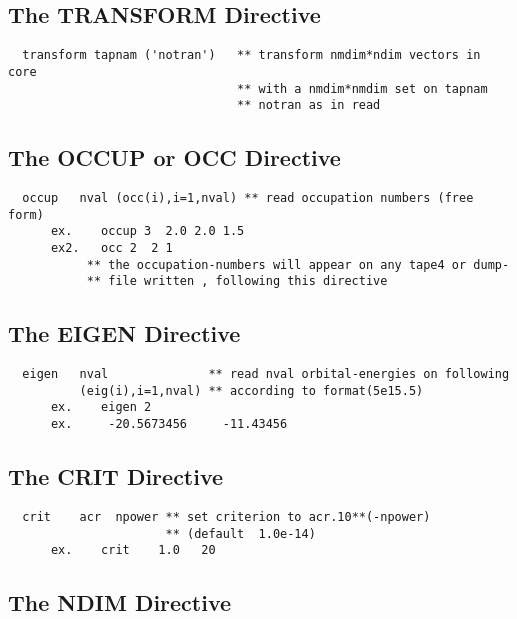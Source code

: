 \documentclass[11pt,fleqn]{article}
\begin{document}
\subsection{The TRANSFORM Directive}

{
\footnotesize
\begin{verbatim} 
  transform tapnam ('notran')   ** transform nmdim*ndim vectors in core
                                ** with a nmdim*nmdim set on tapnam
                                ** notran as in read
\end{verbatim}
}

\subsection{The OCCUP or OCC Directive}

{
\footnotesize
\begin{verbatim} 
  occup   nval (occ(i),i=1,nval) ** read occupation numbers (free form)
      ex.    occup 3  2.0 2.0 1.5
      ex2.   occ 2  2 1 
           ** the occupation-numbers will appear on any tape4 or dump-
           ** file written , following this directive
\end{verbatim}
}

\subsection{The EIGEN Directive}

{
\footnotesize
\begin{verbatim} 
  eigen   nval              ** read nval orbital-energies on following
          (eig(i),i=1,nval) ** according to format(5e15.5)
      ex.    eigen 2
      ex.     -20.5673456     -11.43456
\end{verbatim}
}

\subsection{The CRIT Directive}

{
\footnotesize
\begin{verbatim} 
  crit    acr  npower ** set criterion to acr.10**(-npower)
                      ** (default  1.0e-14)
      ex.    crit    1.0   20
\end{verbatim}
}

\subsection{The NDIM Directive}
\end{document}
